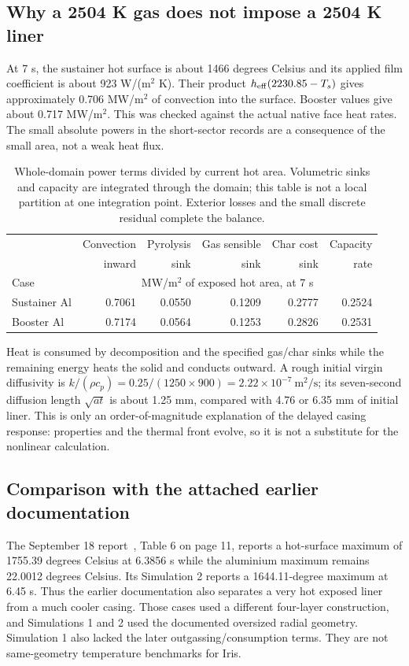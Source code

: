 \documentclass[oneside,openany]{amsdtx}
\begin{document}
\subsection{Why a 2504 K gas does not impose a 2504 K liner}
At 7 s, the sustainer hot surface is about 1466 degrees Celsius and its applied film coefficient is about 923 W/(m$^2$ K). Their product $h_{\rm eff}(2230.85-T_s)$ gives approximately 0.706 MW/m$^2$ of convection into the surface. Booster values give about 0.717 MW/m$^2$. This was checked against the actual native face heat rates. The small absolute powers in the short-sector records are a consequence of the small area, not a weak heat flux.
\begin{table}[H]\centering\small
\begin{tabular}{lrrrrr}\toprule
 & Convection & Pyrolysis & Gas sensible & Char cost & Capacity\\
 & inward & sink & sink & sink & rate\\
Case & \multicolumn{5}{c}{MW/m$^2$ of exposed hot area, at 7 s}\\\midrule
Sustainer Al & 0.7061 & 0.0550 & 0.1209 & 0.2777 & 0.2524\\
Booster Al & 0.7174 & 0.0564 & 0.1253 & 0.2826 & 0.2531\\
\bottomrule\end{tabular}\caption{Whole-domain power terms divided by current hot area. Volumetric sinks and capacity are integrated through the domain; this table is not a local partition at one integration point. Exterior losses and the small discrete residual complete the balance.}\end{table}
Heat is consumed by decomposition and the specified gas/char sinks while the remaining energy heats the solid and conducts outward. A rough initial virgin diffusivity is $k/(\rho c_p)=0.25/(1250\times900)=2.22\times10^{-7}\ \mathrm{m^2/s}$; its seven-second diffusion length $\sqrt{at}$ is about 1.25 mm, compared with 4.76 or 6.35 mm of initial liner. This is only an order-of-magnitude explanation of the delayed casing response: properties and the thermal front evolve, so it is not a substitute for the nonlinear calculation.

\subsection{Comparison with the attached earlier documentation}
The September 18 report~\cite{phenolicseptember}, Table 6 on page 11, reports a hot-surface maximum of 1755.39 degrees Celsius at 6.3856 s while the aluminium maximum remains 22.0012 degrees Celsius. Its Simulation 2 reports a 1644.11-degree maximum at 6.45 s. Thus the earlier documentation also separates a very hot exposed liner from a much cooler casing. Those cases used a different four-layer construction, and Simulations 1 and 2 used the documented oversized radial geometry. Simulation 1 also lacked the later outgassing/consumption terms. They are not same-geometry temperature benchmarks for Iris.
\end{document}
